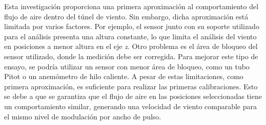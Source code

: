 Esta investigación proporciona una primera aproximación al comportamiento del flujo de aire dentro del túnel de viento. Sin embargo, dicha aproximación está limitada por varios factores. Por ejemplo, el sensor junto con su soporte utilizado para el análisis presenta una altura constante, lo que limita el análisis del viento en posiciones a menor altura en el eje \textit{z}. Otro problema es el área de bloqueo del sensor utilizado, donde la medición debe ser corregida. Para mejorar este tipo de ensayo, se podría utilizar un sensor con menor área de bloqueo, como un tubo Pitot o un anemómetro de hilo caliente. A pesar de estas limitaciones, como primera aproximación, es suficiente para realizar las primeras calibraciones. Esto se debe a que se garantiza que el flujo de aire en las posiciones seleccionadas tiene un comportamiento similar, generando una velocidad de viento comparable para el mismo nivel de modulación por ancho de pulso.






